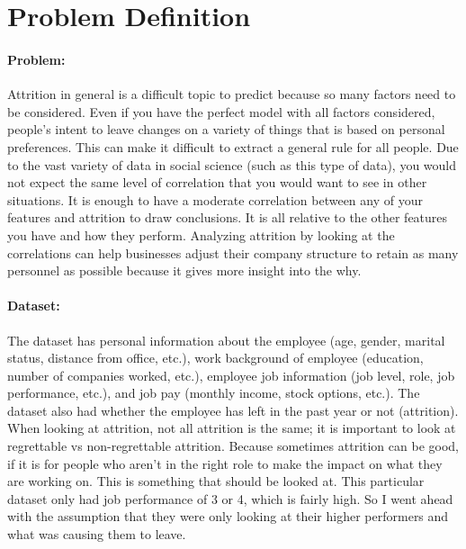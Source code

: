 \documentclass{article}
\begin{document}
\section{Problem Definition}
\vspace{-2mm} 
\label{headings}
\paragraph{Problem:} Attrition in general is a difficult topic to predict because so many factors need to be considered. Even if you have the perfect model with all factors considered, people’s intent to leave changes on a variety of things that is based on personal preferences. This can make it difficult to extract a general rule for all people. Due to the vast variety of data in social science (such as this type of data), you would not expect the same level of correlation that you would want to see in other situations. It is enough to have a moderate correlation between any of your features and attrition to draw conclusions. It is all relative to the other features you have and how they perform. Analyzing attrition by looking at the correlations can help businesses adjust their company structure to retain as many personnel as possible because it gives more insight into the why. 

\paragraph{Dataset:} The dataset has personal information about the employee (age, gender, marital status, distance from office, etc.), work background of employee (education, number of companies worked, etc.), employee job information (job level, role, job performance, etc.), and job pay (monthly income, stock options, etc.).  The dataset also had whether the employee has left in the past year or not (attrition). When looking at attrition, not all attrition is the same; it is important to look at regrettable vs non-regrettable attrition. Because sometimes attrition can be good, if it is for people who aren’t in the right role to make the impact on what they are working on. This is something that should be looked at. This particular dataset only had job performance of 3 or 4, which is fairly high. So I went ahead with the assumption that they were only looking at their higher performers and what was causing them to leave. 
\end{document}
